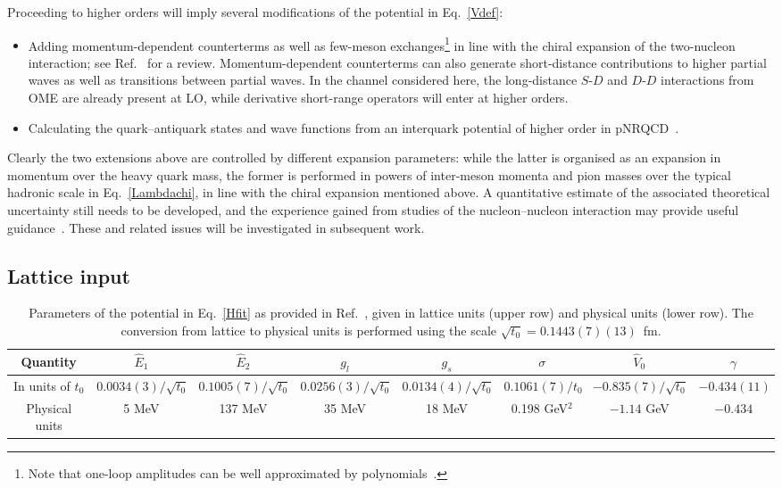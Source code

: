 \documentclass[aps,prd,showpacs,amsmath,twocolumn,superscriptaddress,floatfix,nofootinbib,notitlepage]{revtex4-2}
\begin{document}
Proceeding to higher orders will imply 
several modifications of the potential in Eq.~\eqref{Vdef}:
\begin{itemize}
\item Adding 
momentum-dependent counterterms as well as few-meson exchanges\footnote{Note that one-loop amplitudes can
be well approximated by polynomials~\cite{Chacko:2024cax}.} in line with the chiral expansion of the two-nucleon interaction; see Ref.~\cite{Epelbaum:2008ga} for a review.
Momentum-dependent counterterms can also generate short-distance contributions to higher partial waves as well as transitions between partial waves. In the channel considered here, the long-distance $S$-$D$ and $D$-$D$ interactions from OME are already present at LO, while derivative short-range operators will enter at higher orders.
\item Calculating the quark--antiquark states and wave functions
from an interquark potential of higher order in pNRQCD~\cite{Brambilla:1999xf,Brambilla:2000gk,Pineda:2000sz,Brambilla:2004jw}.
\end{itemize}
Clearly the two extensions above are controlled by different expansion parameters:
while the latter is organised as an expansion in momentum over the heavy quark mass, the
former is performed in powers of inter-meson momenta and pion masses over the typical hadronic scale in Eq.~\eqref{Lambdachi}, in line with the chiral expansion mentioned above.
A quantitative estimate of the associated theoretical uncertainty still needs to be developed, and the experience gained from studies of the nucleon--nucleon interaction may provide useful guidance~\cite{Epelbaum:2014efa,Epelbaum:2014sza,Furnstahl:2014xsa}. These and related issues will be investigated in subsequent work.

\subsection{Lattice input}
\label{sec:lattice}

\begin{table}[t!]
\caption{Parameters of the potential in Eq.~\eqref{Hfit} as provided in Ref.~\cite{Bulava:2024jpj}, given in lattice units (upper row) and physical units (lower row). The conversion from lattice to physical units is performed using the scale $\sqrt{t_0}=0.1443(7)(13)$~fm.}
\label{tab:parametersalt}
\begin{ruledtabular}
\begin{tabular}{cccccccc}
 Quantity & $\hat{E}_1$ & $\hat{E}_2$ & $g_l$&$g_s$&$\sigma$& $\hat{V}_0$ &$\gamma$ \\
 \hline
In units of $t_0$ & $0.0034(3)/\sqrt{t_0}$ &$0.1005(7)/\sqrt{t_0}$&$0.0256(3)/\sqrt{t_0}$&$0.0134(4)/\sqrt{t_0}$&$0.1061(7)/t_0$&$-0.835(7)/\sqrt{t_0}$& $-0.434(11)$ \\
 Physical units &5 MeV&137 MeV&35 MeV&18 MeV &0.198 GeV$^2$& $-1.14$ GeV& $-0.434$
 \label{tab:parameters}
\end{tabular}
\end{ruledtabular}
\end{table}
\end{document}
